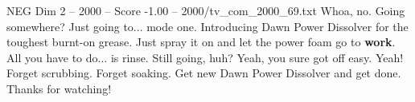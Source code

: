 \begin{textsample}{NEG Dim 2 – 2000 – Score -1.00 – 2000/tv\_com\_2000\_69.txt}  \label{ex:f2_neg_008}
Whoa, no.
Going somewhere?
Just going to... mode one.
Introducing Dawn Power Dissolver for the toughest burnt-on grease.
Just spray it on and let the power foam go to \textbf{work}.
All you have to do... is rinse.
Still going, huh?
Yeah, you sure got off easy.
Yeah!
Forget scrubbing.
Forget soaking.
Get new Dawn Power Dissolver and get done.
Thanks for watching!

\end{textsample}
